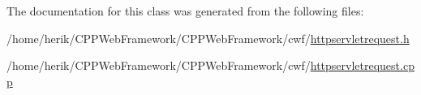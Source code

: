 The documentation for this class was generated from the following files\+:\begin{DoxyCompactItemize}
\item 
/home/herik/\+C\+P\+P\+Web\+Framework/\+C\+P\+P\+Web\+Framework/cwf/\hyperlink{httpservletrequest_8h}{httpservletrequest.\+h}\item 
/home/herik/\+C\+P\+P\+Web\+Framework/\+C\+P\+P\+Web\+Framework/cwf/\hyperlink{httpservletrequest_8cpp}{httpservletrequest.\+cpp}\end{DoxyCompactItemize}
